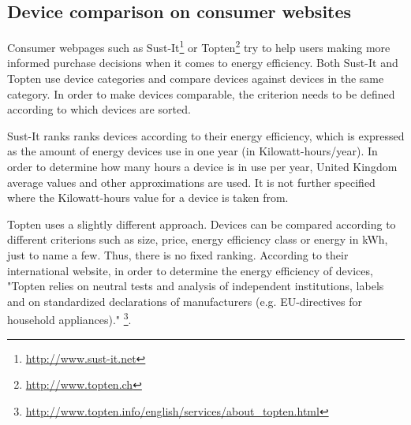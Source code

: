 \subsection*{Device comparison on consumer websites}
Consumer webpages such as Sust-It\footnote{\url{http://www.sust-it.net}} or Topten\footnote{\url{http://www.topten.ch}} try to help users making more informed purchase decisions when it comes to energy efficiency. Both Sust-It and Topten use device categories and compare devices against devices in the same category. In order to make devices comparable, the criterion needs to be defined according to which devices are sorted. 

Sust-It ranks ranks devices according to their energy efficiency, which is expressed as the amount of energy devices use in one year (in Kilowatt-hours/year). In order to determine how many hours a device is in use per year, United Kingdom average values and other approximations are used. It is not further specified where the Kilowatt-hours value for a device is taken from.   

Topten uses a slightly different approach. Devices can be compared according to different criterions such as size, price, energy efficiency class or energy in kWh, just to name a few. Thus, there is no fixed ranking. According to their international website, in order to determine the energy efficiency of devices, "Topten relies on neutral tests and analysis of independent institutions, labels and on standardized declarations of manufacturers (e.g. EU-directives for household appliances)." \footnote{\url{http://www.topten.info/english/services/about_topten.html}}.